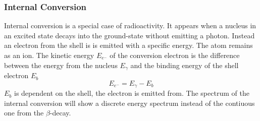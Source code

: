 \documentclass[]{article}
\begin{document}
\subsubsection{Internal Conversion}
Internal conversion is a special case of radioactivity. It appears when a nucleus in an excited state decays into the ground-state without emitting a photon. Instead an electron from the shell is is emitted with a specific energy. The atom remains as an ion. The kinetic energy $E_{e^-}$ of the conversion electron is the difference between the energy from the nucleus $E_{\gamma}$ and the binding energy of the shell electron $E_b$
\begin{equation}
	E_{e^-}=E_{\gamma}-E_b
\end{equation}
$E_b$ is dependent on the shell, the electron is emitted from. The spectrum of the internal conversion will show a discrete energy spectrum instead of the contiuous one from the $\beta$-decay.
\end{document}
